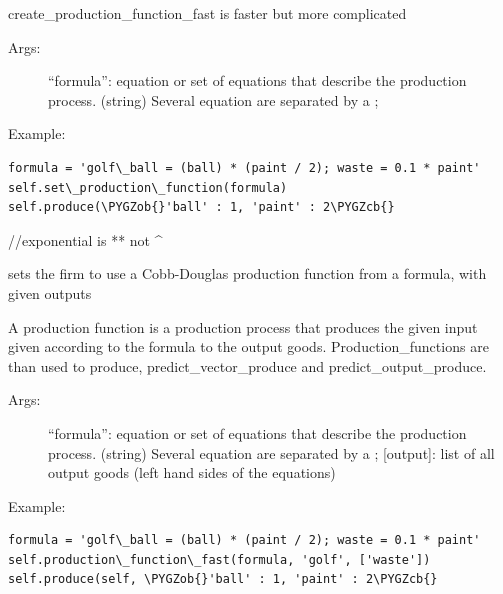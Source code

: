 \documentclass[letterpaper,10pt,english]{sphinxmanual}
\def\PYGZob{\char`\{}
\def\PYGZcb{\char`\}}
\begin{document}
\begin{fulllineitems}
\begin{fulllineitems}
create\_production\_function\_fast is faster but more complicated
\begin{description}
\item[{Args:}] \leavevmode
``formula'': equation or set of equations that describe the
production process. (string) Several equation are separated by a ;

\end{description}

Example:

\begin{Verbatim}[commandchars=\\\{\}]
formula = 'golf\_ball = (ball) * (paint / 2); waste = 0.1 * paint'
self.set\_production\_function(formula)
self.produce(\PYGZob{}'ball' : 1, 'paint' : 2\PYGZcb{}
\end{Verbatim}

//exponential is ** not \textasciicircum{}

\end{fulllineitems}


\begin{fulllineitems}
\label{Firm:abce.Firm.set_production_function_fast}
sets the firm to use a Cobb-Douglas production function from a
formula, with given outputs

A production function is a production process that produces the given
input given according to the formula to the output goods.
Production\_functions are than used to produce, predict\_vector\_produce and
predict\_output\_produce.
\begin{description}
\item[{Args:}] \leavevmode
``formula'': equation or set of equations that describe the
production process. (string) Several equation are separated by a ;
{[}output{]}: list of all output goods (left hand sides of the equations)

\end{description}

Example:

\begin{Verbatim}[commandchars=\\\{\}]
formula = 'golf\_ball = (ball) * (paint / 2); waste = 0.1 * paint'
self.production\_function\_fast(formula, 'golf', ['waste'])
self.produce(self, \PYGZob{}'ball' : 1, 'paint' : 2\PYGZcb{}
\end{Verbatim}


\end{fulllineitems}
\end{fulllineitems}
\end{document}
